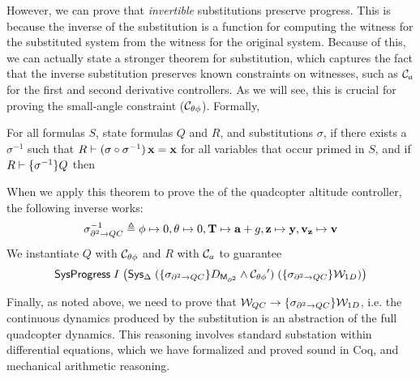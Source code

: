 However, we can prove that \emph{invertible} substitutions preserve
progress.  This is because the inverse of the substitution is a function
for computing the \Enabledness witness for the substituted system from
the \Enabledness witness for the original system.  Because of this, we can
actually state a stronger \progress{} theorem for substitution, which
captures the fact that the inverse substitution preserves known constraints
on \Enabledness witnesses, such as $\Ca$ for the first and second
derivative controllers.  As we will see, this is crucial for proving the
small-angle constraint ($\smallangle$).  Formally,
\begin{theorem}{}
For all formulas $S$, state formulas $Q$ and $R$, and substitutions
$\sigma$, if there exists a $\sigma^{-1}$ such that
$R\entails(\sigma \circ \sigma^{-1})\, \tlavar{x} = \tlavar{x}$ for all
variables  that occur primed in $S$, and if
$R \entails \Rename{\sigma^{-1}}{Q}$ then
\begin{prooftree}
\end{prooftree}
\end{theorem}

When we apply this theorem to prove the \progress{} of the quadcopter
altitude controller, the following inverse works:
\[
\sigma_{\partial^2\rightarrow{}QC}^{-1} \triangleq \tlavar{\roll} \mapsto 0, \tlavar{\pitch} \mapsto 0, \tlavar{T} \mapsto \tlavar{a} + g, \tlavar{z} \mapsto \tlavar{y}, \tlavar{v_z} \mapsto \tlavar{v}
\]
We instantiate $Q$ with $\smallangle$ and $R$ with $\Ca$ to guarantee
\[
\SysNeverStuckP{I}{\big(\Sys{(\Rename{\sigma_{\partial^2\rightarrow{}QC}}{D_{\derivShimx}}\wedge \Next{\smallangle})}{(\Rename{\sigma_{\partial^2\rightarrow{}QC}}{\W_{1D}})}{\Delta}\big)}
\]

Finally, as noted above, we need to prove that
$\W_{QC} \rightarrow \Rename{\sigma_{\partial^2\rightarrow{}QC}}{\W_{1D}}$,
i.e. the continuous dynamics produced by the substitution is an abstraction
of the full quadcopter dynamics.  This reasoning involves standard
substation within differential equations, which we have formalized and
proved sound in Coq, and mechanical arithmetic reasoning.

